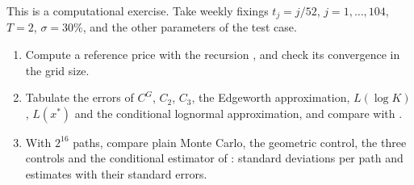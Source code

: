 \begin{exercise}\label{ex:as-weekly}
\medium This is a computational exercise. Take weekly fixings $t_j=j/52$, $j=1,\dots,104$,
$T=2$, $\sigma=30\%$, and the other parameters of the test case.
\begin{enumerate}[label=(\alph*)]
  \item Compute a reference price with the recursion , and check its
    convergence in the grid size.
  \item Tabulate the errors of $C^G$, $C_2$, $C_3$, the Edgeworth approximation, $L(\log K)$,
    $L(x^*)$ and the conditional lognormal approximation, and compare with
    .
  \item With $2^{16}$ paths, compare plain Monte Carlo, the geometric control, the three controls
    and the conditional estimator of : standard deviations per path and
    estimates with their standard errors.
\end{enumerate}
\end{exercise}

